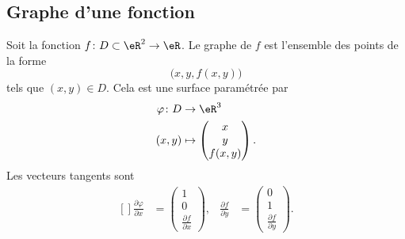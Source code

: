 \subsection{Graphe d'une fonction}

Soit la fonction \( f\colon D\subset\eR^2\to \eR\). Le graphe de \( f\) est l'ensemble des points de la forme
\begin{equation}
	\big( x,y,f(x,y) \big)
\end{equation}
tels que \( (x,y)\in D\). Cela est une surface paramétrée par
\begin{equation}
	\begin{aligned}
		\varphi\colon D & \to \eR^3              \\
		(x,y)           & \mapsto \begin{pmatrix}
			                          x \\
			                          y \\
			                          f(x,y)
		                          \end{pmatrix}.
	\end{aligned}
\end{equation}
Les vecteurs tangents sont
\begin{equation}
	\begin{aligned}[]
		\frac{ \partial \varphi }{ \partial x } & =\begin{pmatrix}
			                                           1 \\
			                                           0 \\
			                                           \frac{ \partial f }{ \partial x }
		                                           \end{pmatrix},
		                                        & \frac{ \partial f }{ \partial y } & =\begin{pmatrix}
			                                                                               0 \\
			                                                                               1 \\
			                                                                               \frac{ \partial f}{ \partial y }
		                                                                               \end{pmatrix}.
	\end{aligned}
\end{equation}
